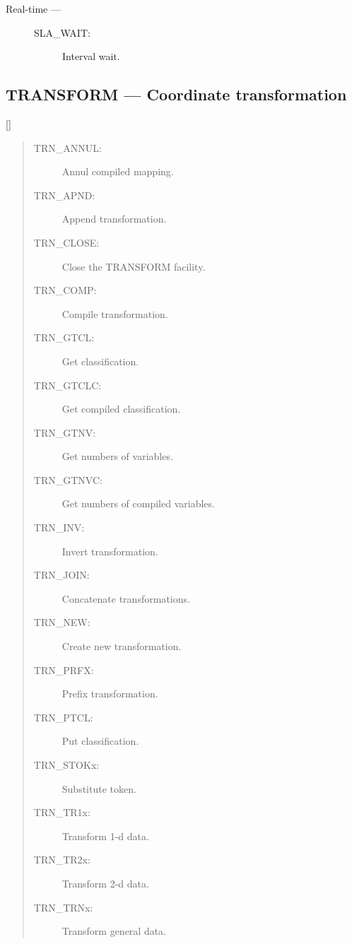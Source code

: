 \begin{description}
\item [Real-time ---]

\begin{description}
\item [SLA\_WAIT:]  Interval wait.
\end{description}

\end{description}

\newpage

\subsection{TRANSFORM --- Coordinate transformation}

\vspace{-9mm}

\hfill []

\vspace{2mm}

\begin{quote}
\begin{description}
\item [TRN\_ANNUL:]  Annul compiled mapping.
\item [TRN\_APND:]  Append transformation.
\item [TRN\_CLOSE:]  Close the TRANSFORM facility.
\item [TRN\_COMP:]  Compile transformation.
\item [TRN\_GTCL:]  Get classification.
\item [TRN\_GTCLC:]  Get compiled classification.
\item [TRN\_GTNV:]  Get numbers of variables.
\item [TRN\_GTNVC:]  Get numbers of compiled variables.
\item [TRN\_INV:]  Invert transformation.
\item [TRN\_JOIN:]  Concatenate transformations.
\item [TRN\_NEW:]  Create new transformation.
\item [TRN\_PRFX:]  Prefix transformation.
\item [TRN\_PTCL:]  Put classification.
\item [TRN\_STOKx:]  Substitute token.
\item [TRN\_TR1x:]  Transform 1-d data.
\item [TRN\_TR2x:]  Transform 2-d data.
\item [TRN\_TRNx:]  Transform general data.
\end{description}
\end{quote}
